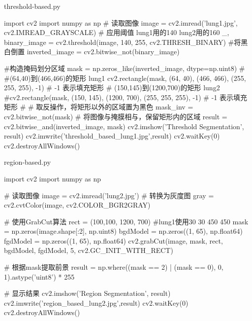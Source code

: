 \documentclass[12pt]{article}
\begin{document}
\begin{large}
    \noindent threshold-based.py
\end{large}
\begin{python}
import cv2
import numpy as np
# 读取图像
image = cv2.imread('lung1.jpg', cv2.IMREAD_GRAYSCALE)
# 应用阈值 lung1用的140 lung2用的160
_, binary_image = cv2.threshold(image, 140, 255, cv2.THRESH_BINARY)
#将黑白倒置
inverted_image = cv2.bitwise_not(binary_image)

#构造掩码划分区域
mask = np.zeros_like(inverted_image, dtype=np.uint8)
# #(64,40)到(466,466)的矩形  lung1
cv2.rectangle(mask, (64, 40), (466, 466), (255, 255, 255), -1)  # -1 表示填充矩形
# (150,145)到(1200,700)的矩形 lung2
#cv2.rectangle(mask, (150, 145), (1200, 700), (255, 255, 255), -1)  # -1 表示填充矩形
# # 取反操作，将矩形以外的区域置为黑色
mask_inv = cv2.bitwise_not(mask)
# 将图像与掩膜相与，保留矩形内的区域
result = cv2.bitwise_and(inverted_image, mask)
cv2.imshow('Threshold Segmentation', result)
cv2.imwrite('threshold_based_lung1.jpg',result)
cv2.waitKey(0)
cv2.destroyAllWindows()
\end{python}
\newpage
\begin{large}
    \noindent region-based.py
\end{large}
\begin{python}
import cv2
import numpy as np

# 读取图像
image = cv2.imread('lung2.jpg')
# 转换为灰度图
gray = cv2.cvtColor(image, cv2.COLOR_BGR2GRAY)

# 使用GrabCut算法
rect = (100,100, 1200, 700) #lung1使用30 30 450 450
mask = np.zeros(image.shape[:2], np.uint8)
bgdModel = np.zeros((1, 65), np.float64)
fgdModel = np.zeros((1, 65), np.float64)
cv2.grabCut(image, mask, rect, bgdModel, fgdModel, 5, cv2.GC_INIT_WITH_RECT)

# 根据mask提取前景
result = np.where((mask == 2) | (mask == 0), 0, 1).astype('uint8') * 255

# 显示结果
cv2.imshow('Region Segmentation', result)
cv2.imwrite('region_based_lung2.jpg',result)
cv2.waitKey(0)
cv2.destroyAllWindows()
\end{python}
\end{document}
